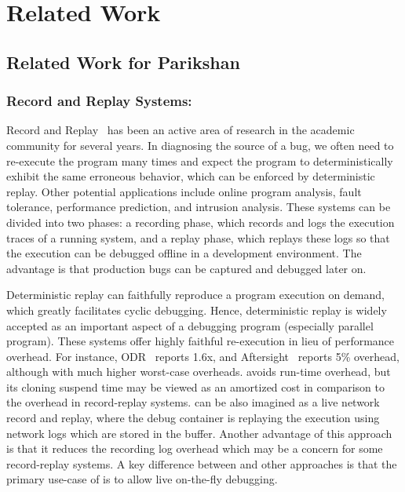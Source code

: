 \chapter{Related Work}

\section{Related Work for Parikshan}


\subsection{Record and Replay Systems:}  
Record and Replay~\cite{odr,revirt,guo2008r2,geels2007friday,doubleplay} has been an active area of research in the academic community for several years.
In diagnosing the source of a bug, we often need to re-execute the program many times and expect the program to deterministically exhibit the same
erroneous behavior, which can be enforced by deterministic replay. 
Other potential applications include online program analysis, fault tolerance, performance prediction, and intrusion analysis.
These systems can be divided into two phases: a recording phase, which records and logs the execution traces of a running system, and a replay phase, which replays these logs so that the execution can be debugged offline in a development environment.
The advantage is that production bugs can be captured and debugged later on. 

Deterministic replay can faithfully reproduce a program execution on demand, which greatly facilitates cyclic debugging. Hence, deterministic replay is widely accepted as an important aspect of a debugging program (especially parallel program).
These systems offer highly faithful re-execution in lieu of performance overhead. 
For instance, ODR~\cite{odr} reports 1.6x, and Aftersight~\cite{aftersight} reports 5\% overhead, although with much higher worst-case overheads.
\parikshan avoids run-time overhead, but its cloning suspend time may be viewed as an amortized cost in comparison to the overhead in record-replay systems.
\parikshan can be also imagined as a live network record and replay, where the debug container is replaying the execution using network logs which are stored in the buffer.
Another advantage of this approach is that it reduces the recording log overhead which may be a concern for some record-replay systems.
A key difference between \parikshan and other approaches is that the primary use-case of \parikshan is to allow live on-the-fly debugging.

